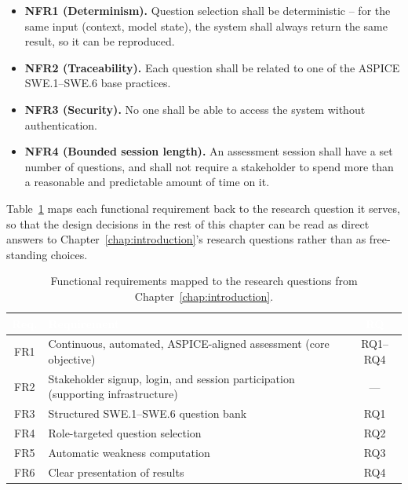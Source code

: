 \documentclass[a4paper, 12pt, oneside, openany, BCOR1cm,toc=chapterentrywithdots]{scrbook}
\newcommand{\thw}[1]{\textcolor{white}{\textbf{#1}}}
\begin{document}
\begin{itemize}
  \item \textbf{NFR1 (Determinism).} Question selection shall be deterministic -- for the same
  input (context, model state), the system shall always return the same result, so it can be
  reproduced.
  \item \textbf{NFR2 (Traceability).} Each question shall be related to one of the ASPICE
  SWE.1--SWE.6 base practices.
  \item \textbf{NFR3 (Security).} No one shall be able to access the system without
  authentication.
  \item \textbf{NFR4 (Bounded session length).} An assessment session shall have a set number of
  questions, and shall not require a stakeholder to spend more than a reasonable and predictable
  amount of time on it.
\end{itemize}

Table~\ref{tab:fr-traceability} maps each functional requirement back to the research question
it serves, so that the design decisions in the rest of this chapter can be read as direct answers
to Chapter~\ref{chap:introduction}'s research questions rather than as free-standing choices.

\begin{table}[h]
\centering
{}
\begin{tabular}{c p{9.5cm} c}
\toprule
\rowcolor{green!55!black}
\thw{Req.} & \thw{Requirement} & \thw{RQ} \\
\midrule
FR1 & Continuous, automated, ASPICE-aligned assessment (core objective) & RQ1--RQ4 \\
FR2 & Stakeholder signup, login, and session participation (supporting infrastructure) & --- \\
FR3 & Structured SWE.1--SWE.6 question bank & RQ1 \\
FR4 & Role-targeted question selection & RQ2 \\
FR5 & Automatic weakness computation & RQ3 \\
FR6 & Clear presentation of results & RQ4 \\
\bottomrule
\end{tabular}
\caption{Functional requirements mapped to the research questions from
Chapter~\ref{chap:introduction}.}
\label{tab:fr-traceability}
\end{table}

\end{document}
